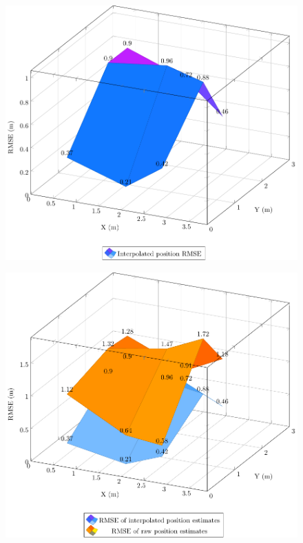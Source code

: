\documentclass[a4paper, oneside]{ipsreport}
\begin{document}
\begin{figure}[h!]
	\begin{minipage}{.5\textwidth}
		\centering
		\includegraphics[width=\linewidth]{./figures/rmse/11window10avg.pdf}
		\label{fig:11window10avg}
	\end{minipage}
	\begin{minipage}{.5\textwidth}
		\centering
		\includegraphics[width=\linewidth]{./figures/rmse/rawinterpolatedcomparison.pdf}
		\label{fig:rawinterpolatedcomparison}
	\end{minipage}
\end{figure}
\end{document}
